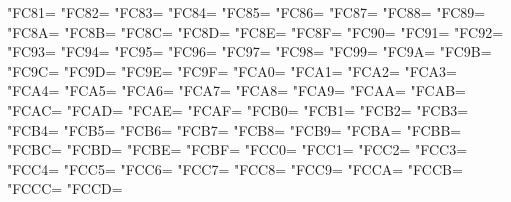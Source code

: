 \XeTeXcharclass"FC81=\KclassArabU
\XeTeXcharclass"FC82=\KclassArabU
\XeTeXcharclass"FC83=\KclassArabU
\XeTeXcharclass"FC84=\KclassArabU
\XeTeXcharclass"FC85=\KclassArabU
\XeTeXcharclass"FC86=\KclassArabU
\XeTeXcharclass"FC87=\KclassArabU
\XeTeXcharclass"FC88=\KclassArabU
\XeTeXcharclass"FC89=\KclassArabU
\XeTeXcharclass"FC8A=\KclassArabU
\XeTeXcharclass"FC8B=\KclassArabU
\XeTeXcharclass"FC8C=\KclassArabU
\XeTeXcharclass"FC8D=\KclassArabU
\XeTeXcharclass"FC8E=\KclassArabU
\XeTeXcharclass"FC8F=\KclassArabU
\XeTeXcharclass"FC90=\KclassArabU
\XeTeXcharclass"FC91=\KclassArabU
\XeTeXcharclass"FC92=\KclassArabU
\XeTeXcharclass"FC93=\KclassArabU
\XeTeXcharclass"FC94=\KclassArabU
\XeTeXcharclass"FC95=\KclassArabU
\XeTeXcharclass"FC96=\KclassArabU
\XeTeXcharclass"FC97=\KclassArabU
\XeTeXcharclass"FC98=\KclassArabU
\XeTeXcharclass"FC99=\KclassArabU
\XeTeXcharclass"FC9A=\KclassArabU
\XeTeXcharclass"FC9B=\KclassArabU
\XeTeXcharclass"FC9C=\KclassArabU
\XeTeXcharclass"FC9D=\KclassArabU
\XeTeXcharclass"FC9E=\KclassArabU
\XeTeXcharclass"FC9F=\KclassArabU
\XeTeXcharclass"FCA0=\KclassArabU
\XeTeXcharclass"FCA1=\KclassArabU
\XeTeXcharclass"FCA2=\KclassArabU
\XeTeXcharclass"FCA3=\KclassArabU
\XeTeXcharclass"FCA4=\KclassArabU
\XeTeXcharclass"FCA5=\KclassArabU
\XeTeXcharclass"FCA6=\KclassArabU
\XeTeXcharclass"FCA7=\KclassArabU
\XeTeXcharclass"FCA8=\KclassArabU
\XeTeXcharclass"FCA9=\KclassArabU
\XeTeXcharclass"FCAA=\KclassArabU
\XeTeXcharclass"FCAB=\KclassArabU
\XeTeXcharclass"FCAC=\KclassArabU
\XeTeXcharclass"FCAD=\KclassArabU
\XeTeXcharclass"FCAE=\KclassArabU
\XeTeXcharclass"FCAF=\KclassArabU
\XeTeXcharclass"FCB0=\KclassArabU
\XeTeXcharclass"FCB1=\KclassArabU
\XeTeXcharclass"FCB2=\KclassArabU
\XeTeXcharclass"FCB3=\KclassArabU
\XeTeXcharclass"FCB4=\KclassArabU
\XeTeXcharclass"FCB5=\KclassArabU
\XeTeXcharclass"FCB6=\KclassArabU
\XeTeXcharclass"FCB7=\KclassArabU
\XeTeXcharclass"FCB8=\KclassArabU
\XeTeXcharclass"FCB9=\KclassArabU
\XeTeXcharclass"FCBA=\KclassArabU
\XeTeXcharclass"FCBB=\KclassArabU
\XeTeXcharclass"FCBC=\KclassArabU
\XeTeXcharclass"FCBD=\KclassArabU
\XeTeXcharclass"FCBE=\KclassArabU
\XeTeXcharclass"FCBF=\KclassArabU
\XeTeXcharclass"FCC0=\KclassArabU
\XeTeXcharclass"FCC1=\KclassArabU
\XeTeXcharclass"FCC2=\KclassArabU
\XeTeXcharclass"FCC3=\KclassArabU
\XeTeXcharclass"FCC4=\KclassArabU
\XeTeXcharclass"FCC5=\KclassArabU
\XeTeXcharclass"FCC6=\KclassArabU
\XeTeXcharclass"FCC7=\KclassArabU
\XeTeXcharclass"FCC8=\KclassArabU
\XeTeXcharclass"FCC9=\KclassArabU
\XeTeXcharclass"FCCA=\KclassArabU
\XeTeXcharclass"FCCB=\KclassArabU
\XeTeXcharclass"FCCC=\KclassArabU
\XeTeXcharclass"FCCD=\KclassArabU
